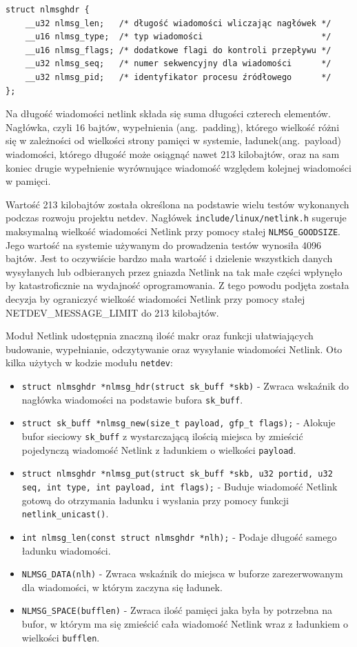 \documentclass[11pt]{scrartcl}
\begin{document}
\begin{verbatim}
struct nlmsghdr {
    __u32 nlmsg_len;   /* długość wiadomości wliczając nagłówek */
    __u16 nlmsg_type;  /* typ wiadomości                        */
    __u16 nlmsg_flags; /* dodatkowe flagi do kontroli przepływu */
    __u32 nlmsg_seq;   /* numer sekwencyjny dla wiadomości      */
    __u32 nlmsg_pid;   /* identyfikator procesu źródłowego      */
};
\end{verbatim}

Na długość wiadomości netlink składa się suma długości czterech elementów. Nagłówka, czyli 16 bajtów, wypełnienia (ang.\ padding), którego wielkość różni się w zależności od wielkości strony pamięci w systemie, ładunek(ang.\ payload) wiadomości, którego długość może osiągnąć nawet 213 kilobajtów, oraz na sam koniec drugie wypełnienie wyrównujące wiadomość względem kolejnej wiadomości w pamięci.

Wartość 213 kilobajtów została określona na podstawie wielu testów wykonanych podczas rozwoju projektu netdev. Nagłówek \texttt{include/linux/netlink.h} sugeruje maksymalną wielkość wiadomości Netlink przy pomocy stałej \texttt{NLMSG\_GOODSIZE}. Jego wartość na systemie używanym do prowadzenia testów wynosiła 4096 bajtów. Jest to oczywiście bardzo mała wartość i dzielenie wszystkich danych wysyłanych lub odbieranych przez gniazda Netlink na tak małe części wpłynęło by katastroficznie na wydajność oprogramowania. Z tego powodu podjęta została decyzja by ograniczyć wielkość wiadomości Netlink przy pomocy stałej NETDEV\_MESSAGE\_LIMIT do 213 kilobajtów.

Moduł Netlink udostępnia znaczną ilość makr oraz funkcji ułatwiających budowanie, wypełnianie, odczytywanie oraz wysyłanie wiadomości Netlink.  Oto kilka użytych w kodzie modułu \texttt{netdev}:

\begin{itemize}
\itemsep1pt\parskip0pt
\item
  \texttt{struct nlmsghdr *nlmsg\_hdr(struct sk\_buff *skb)} - Zwraca wskaźnik do nagłówka wiadomości na podstawie bufora \texttt{sk\_buff}.
\item
  \texttt{struct sk\_buff *nlmsg\_new(size\_t payload, gfp\_t flags);} - Alokuje bufor sieciowy \texttt{sk\_buff} z wystarczającą ilością miejsca by zmieścić pojedynczą wiadomość Netlink z ładunkiem o wielkości \texttt{payload}.
\item
  \texttt{struct nlmsghdr *nlmsg\_put(struct sk\_buff *skb, u32 portid, u32 seq, int type, int payload, int flags);} - Buduje wiadomość Netlink gotową do otrzymania ładunku i wysłania przy pomocy funkcji \texttt{netlink\_unicast()}.
\item
  \texttt{int nlmsg\_len(const struct nlmsghdr *nlh);} - Podaje długość samego ładunku wiadomości.
\item
  \texttt{NLMSG\_DATA(nlh)} - Zwraca wskaźnik do miejsca w buforze zarezerwowanym dla wiadomości, w którym zaczyna się ładunek.
\item
  \texttt{NLMSG\_SPACE(bufflen)} - Zwraca ilość pamięci jaka była by potrzebna na bufor, w którym ma się zmieścić cała wiadomość Netlink wraz z ładunkiem o wielkości \texttt{bufflen}.
\end{itemize}
\end{document}
